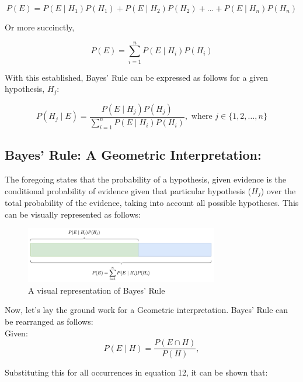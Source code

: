 \documentclass[12pt]{article}
\begin{document}
\begin{equation}
P(E) = P(E \mid H_1) P(H_1) + P(E \mid H_2) P(H_2) + ... + P(E \mid H_n) P(H_n)
\end{equation}

\noindent Or more succinctly, 

\begin{equation}
P(E) = \sum_{i=1}^{n} P(E \mid H_i) P(H_i)
\end{equation}

\noindent With this established, Bayes' Rule can be expressed as follows for a given hypothesis, $H_j$: 

\begin{equation}
P(H_j \mid E) = \frac{P(E \mid H_j) P(H_j)}{\sum_{i=1}^{n} P(E \mid H_i) P(H_i)}, \text{ where } j \in \{1, 2, \ldots, n\}
\end{equation}

\subsection*{Bayes' Rule: A Geometric Interpretation:}
\noindent The foregoing states that the probability of a hypothesis, given evidence is the conditional probability of evidence given that particular hypothesis ($H_j$) over the total probability of the evidence, taking into account all possible hypotheses. This can be visually represented as follows: \\

\begin{figure}[h!]
\centering
\includegraphics[width=0.75\textwidth]{assets/visual_2.png} 
\caption{A visual representation of Bayes' Rule}
\label{fig:cond_prob}
\end{figure}

\noindent Now, let's lay the ground work for a Geometric interpretation. Bayes' Rule can be rearranged as follows:\\

\noindent Given:
\begin{equation}
P(E \mid H) = \frac{P(E \cap H)}{P(H)},
\end{equation}

\noindent Substituting this for all occurrences in equation 12, it can be shown that:
\end{document}

